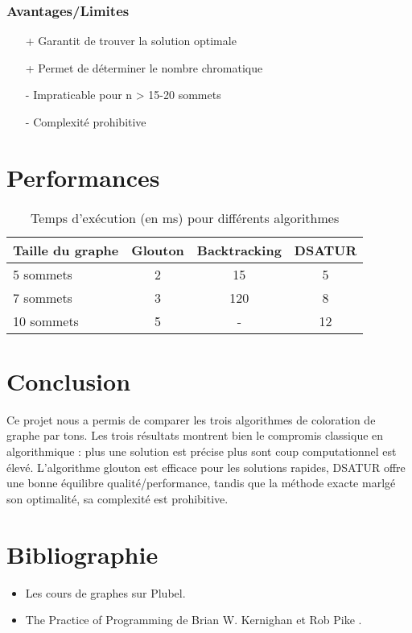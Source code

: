 \documentclass[a4paper,11pt]{article}
\begin{document}
\subsubsection{Avantages/Limites}
\begin{itemize}
\item [+] Garantit de trouver la solution optimale
\item [+] Permet de déterminer le nombre chromatique
\item [-] Impraticable pour n > 15-20 sommets
\item [-] Complexité prohibitive
\end{itemize}

\section{Performances}
\begin{table}[h]
\centering
\caption{Temps d'exécution (en ms) pour différents algorithmes}
\begin{tabular}{lccc}
\toprule
Taille du graphe & Glouton & Backtracking & DSATUR \\
\midrule
5 sommets & 2 & 15 & 5 \\
7 sommets & 3 & 120 & 8 \\
10 sommets & 5 & - & 12 \\
\bottomrule
\end{tabular}
\end{table}

\section{Conclusion}
Ce projet nous a permis de comparer les trois algorithmes de coloration de graphe par tons.
Les trois résultats montrent bien le compromis classique en algorithmique :  
plus une solution est précise plus sont coup computationnel est élevé.
L'algorithme glouton est efficace pour les solutions rapides, DSATUR offre une bonne équilibre qualité/performance, 
tandis que la méthode exacte marlgé son optimalité, sa complexité est prohibitive.

\section{Bibliographie}
\begin{itemize}
\item Les cours de graphes sur Plubel.
\item The Practice of Programming de Brian W. Kernighan et Rob Pike .
\end{itemize}
\end{document}
